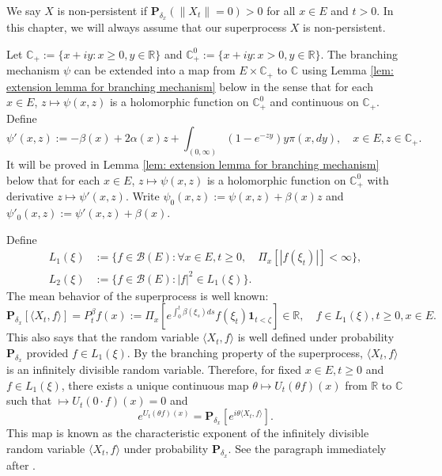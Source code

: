 \documentclass[UTF8]{pkuthss}
\theoremstyle{plain}
\theoremstyle{definition}
\numberwithin{equation}{section}
\begin{document}
    We say $X$ is non-persistent if $\mathbf P_{\delta_x}(\|X_t\| = 0)>0$ for all $x\in E$ and $t >0$. 
    In this chapter, we will always assume that our superprocess $X$ is non-persistent.

    Let $\mathbb C_+:=\{x+iy:x\geq 0, y\in \mathbb R\}$ and $\mathbb C_+^0:=\{x+iy: x>0, y\in \mathbb R\}$.
    The branching mechanism $\psi$ can be extended into a map from $E \times \mathbb C_+$ to $\mathbb C$ using Lemma \ref{lem: extension lemma for branching mechanism} below in the sense that for each $x\in E$, $z\mapsto \psi(x,z)$ is a holomorphic function on $\mathbb C_+^0$ and continuous on $\mathbb C_+$.
    Define
\begin{equation}
    \psi'(x,z):= - \beta(x) + 2\alpha(x) z + \int_{(0,\infty)} (1-e^{-zy})y\pi(x,dy),
    \quad x\in E, z\in \mathbb C_+.
\end{equation}
    It will be proved in Lemma \ref{lem: extension lemma for branching mechanism} below that for each $x \in E$, $z \mapsto \psi(x,z)$ is a holomorphic function on $\mathbb C_+^0$ with derivative $z \mapsto \psi'(x,z)$.
    Write $\psi_0(x,z) := \psi(x,z)+ \beta(x)z $ and $\psi'_0(x,z) := \psi'(x,z) + \beta(x)$.

    Define
\begin{align}
    L_1(\xi)
    &:= \{f\in \mathcal B(E): \forall x\in E, t\geq 0, \quad \Pi_x[|f(\xi_t)|]< \infty\},
    \\L_2(\xi)
    &:= \{f \in \mathcal B(E): |f|^2 \in L_1(\xi)\}.
\end{align}
    The mean behavior of the superprocess is well known:
\begin{equation}   
    \mathbf P_{\delta_x}[\langle X_t,f\rangle]
    =P^{\beta}_t f(x):= \Pi_x[e^{\int_0^t \beta(\xi_s)ds}f(\xi_t)\mathbf 1_{t < \zeta}] \in \mathbb R,
    \quad f\in L_1(\xi), t \geq 0,x\in E.
\end{equation}
    This also says that the random variable $\langle X_t, f\rangle$ is well defined under probability $\mathbf P_{\delta_x}$ provided $f\in L_1(\xi)$.
    By the branching property of the superprocess, $\langle X_t, f\rangle$ is an infinitely divisible random variable.
    Therefore, for fixed $x\in E, t\geq 0$ and $f\in L_1(\xi)$, there exists a unique continuous map $\theta \mapsto U_t(\theta f)(x)$ from $\mathbb R$ to $\mathbb C$ such that $\mapsto U_t(0\cdot f)(x) = 0$ and
\[
    e^{U_t(\theta f)(x)} = \mathbf P_{\delta_x}[e^{i\theta \langle X_t,f\rangle}].
\]
    This map is known as the characteristic exponent of the infinitely divisible random variable $\langle X_t,f\rangle$ under probability $\mathbf P_{\delta_x}$. 
    See the paragraph immediately after \cite[Lemma 7.6]{Sato2013Levy}.
\end{document}
